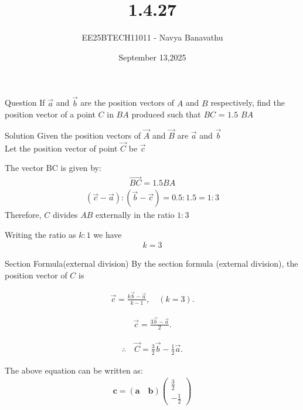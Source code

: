 \documentclass{beamer}
\title{1.4.27}
\date{September 13,2025}
\author{EE25BTECH11011 - Navya Banavathu}
\begin{document}
\frame{\titlepage}

\begin{frame}{Question}
If $\vec{a}$ and $\vec{b}$ are the position vectors of $A$ and $B$ respectively, find the position vector of a point $C$ in $BA$ produced such that $BC$ = $1.5$ $BA$
\end{frame}

\begin{frame}{Solution}
Given the position vectors of $\vec{A}$ and  $\vec{B}$  are  $\vec{a}$ and  $\vec{b}$ \\
Let the position vector of point $\vec{C}$ be  $\vec{c}$ 

The vector {BC} is given by:
\begin{align}
\vec{BC}=   1.5{BA}
\end{align}
\begin{align}
 (\vec{c}-\vec{a}) : (\vec{b}-\vec{c}) = 0.5 : 1.5 = 1 : 3 
\end{align}
Therefore, $ C $ divides $ AB $ externally in the ratio $ 1:3 $

Writing the ratio as $ k:1 $ 
we have 
\begin{align}
k=3
\end{align}

\end{frame}

\begin{frame}{Section Formula(external division)}
By the section formula (external division), the position vector of $C$  is
\begin{center}
\begin{align}
\vec{c}= \frac{k\vec{b} - \vec{a}}{k-1}, \quad (k=3).
\end{align}

\begin{align}
\vec{c} = \frac{3\vec{b} - \vec{a}}{2}.
\end{align}

\begin{align}
\therefore \quad \vec{C} =  \tfrac{3}{2}\vec{b} - \tfrac{1}{2}\vec{a} .
\end{align}

The above equation can be written as:
\begin{align}
\mathbf{c} = (\mathbf{a} \quad \mathbf{b})
\begin{pmatrix}
\frac{3}{2} \\
-\frac{1}{2}
\end{pmatrix}
\end{align}
\end{center}
\end{frame}
\end{document}
